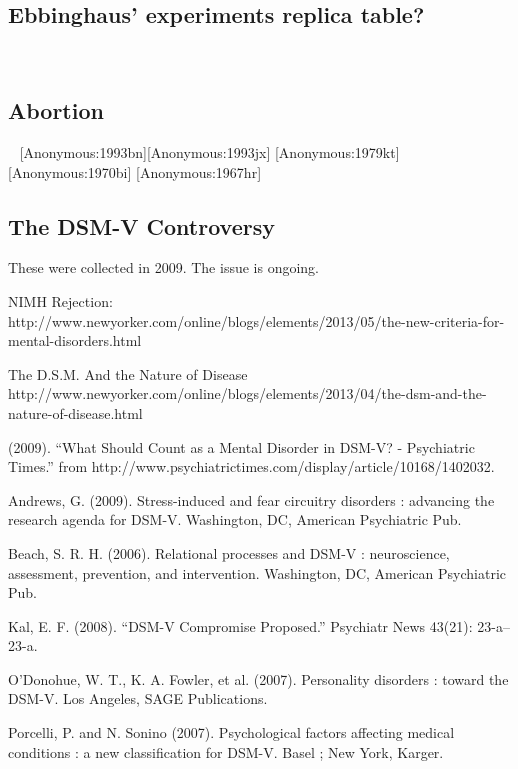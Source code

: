 \begin{refsection}
\subsection{Ebbinghaus’ experiments replica table?}
\label{ebbinghaus’experimentsreplicatable}

~\citep{Murre:2015ix}

\subsection{Abortion}
\label{abortion}

~\citep{Anonymous:1993fb}
[Anonymous:1993bn][Anonymous:1993jx]
[Anonymous:1979kt][Anonymous:1970bi]
[Anonymous:1967hr]

\subsection{The DSM-V Controversy}
\label{thedsm-vcontroversy}

These were collected in 2009. The issue is ongoing.

NIMH Rejection: http:\slash \slash www.newyorker.com\slash online\slash blogs\slash elements\slash 2013\slash 05\slash the-new-criteria-for-mental-disorders.html 

The D.S.M. And the Nature of Disease
http:\slash \slash www.newyorker.com\slash online\slash blogs\slash elements\slash 2013\slash 04\slash the-dsm-and-the-nature-of-disease.html 

(2009). ``What Should Count as a Mental Disorder in DSM-V? - Psychiatric Times.'' from http:\slash \slash www.psychiatrictimes.com\slash display\slash article\slash 10168\slash 1402032.

Andrews, G. (2009). Stress-induced and fear circuitry disorders : advancing the research agenda for DSM-V. Washington, DC, American Psychiatric Pub.

Beach, S. R. H. (2006). Relational processes and DSM-V : neuroscience, assessment, prevention, and intervention. Washington, DC, American Psychiatric Pub.

Kal, E. F. (2008). ``DSM-V Compromise Proposed.'' Psychiatr News 43(21): 23-a--23-a.

O'Donohue, W. T., K. A. Fowler, et al. (2007). Personality disorders : toward the DSM-V. Los Angeles, SAGE Publications.

Porcelli, P. and N. Sonino (2007). Psychological factors affecting medical conditions : a new classification for DSM-V. Basel ; New York, Karger.


\end{refsection}
